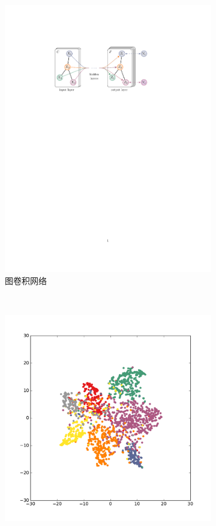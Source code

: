 \documentclass{article} %
\begin{document}
\begin{figure}[htp]
    \centering
    \begin{subfigure}[b]{0.67\textwidth}
        \centering
    \includegraphics[clip, trim=5cm 18.8cm 6.4cm 4.4cm, width=\textwidth]{graph_simple.pdf}
        \caption{图卷积网络}
        \label{fig:model-a}
    \end{subfigure}%
    ~
    \begin{subfigure}[b]{0.33\textwidth}
        \centering
        \includegraphics[width=\textwidth, trim={4cm 4cm 4cm 4cm}, clip]{tsne_cora_6.pdf}

\end{subfigure}
\end{figure}
\end{document}

